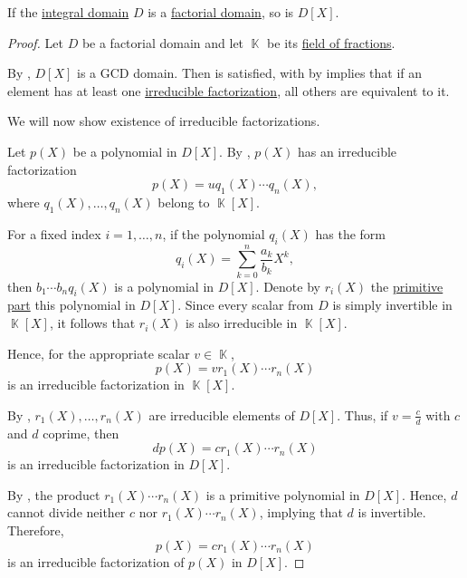 \begin{proposition}\label{thm:polynomial_ring_over_factorial}
  If the \hyperref[def:integral_domain]{integral domain} \( D \) is a \hyperref[def:factorial_domain]{factorial domain}, so is \( D[X] \).
\end{proposition}
\begin{proof}
  Let \( D \) be a factorial domain and let \( \BbbK \) be its \hyperref[thm:field_of_fractions]{field of fractions}.

  By , \( D[X] \) is a GCD domain. Then  is satisfied, with by  implies that if an element has at least one \hyperref[def:irreducible_factorization]{irreducible factorization}, all others are equivalent to it.

  We will now show existence of irreducible factorizations.

  Let \( p(X) \) be a polynomial in \( D[X] \). By , \( p(X) \) has an irreducible factorization
  \begin{equation*}
    p(X) = u q_1(X) \cdots q_n(X),
  \end{equation*}
  where \( q_1(X), \ldots, q_n(X) \) belong to \( \BbbK[X] \).

  For a fixed index \( i = 1, \ldots, n \), if the polynomial \( q_i(X) \) has the form
  \begin{equation*}
    q_i(X) = \sum_{k=0}^n \frac {a_k} {b_k} X^k,
  \end{equation*}
  then \( b_1 \cdots b_n q_i(X) \) is a polynomial in \( D[X] \). Denote by \( r_i(X) \) the \hyperref[def:polynomial_content]{primitive part} this polynomial in \( D[X] \). Since every scalar from \( D \) is simply invertible in \( \BbbK[X] \), it follows that \( r_i(X) \) is also irreducible in \( \BbbK[X] \).

  Hence, for the appropriate scalar \( v \in \BbbK \),
  \begin{equation*}
    p(X) = v r_1(X) \cdots r_n(X)
  \end{equation*}
  is an irreducible factorization in \( \BbbK[X] \).

  By , \( r_1(X), \ldots, r_n(X) \) are irreducible elements of \( D[X] \). Thus, if \( v = \tfrac c d \) with \( c \) and \( d \) coprime, then
  \begin{equation*}
    d p(X) = c r_1(X) \cdots r_n(X)
  \end{equation*}
  is an irreducible factorization in \( D[X] \).

  By , the product \( r_1(X) \cdots r_n(X) \) is a primitive polynomial in \( D[X] \). Hence, \( d \) cannot divide neither \( c \) nor \( r_1(X) \cdots r_n(X) \), implying that \( d \) is invertible. Therefore,
  \begin{equation*}
    p(X) = c r_1(X) \cdots r_n(X)
  \end{equation*}
  is an irreducible factorization of \( p(X) \) in \( D[X] \).
\end{proof}

